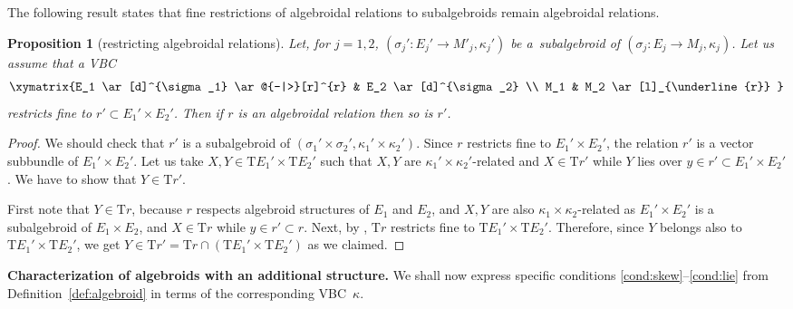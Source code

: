 \documentclass[10pt,a4paper]{amsart}
\newcommand{\ZM}{{VBC}} %
\newcommand{\und}{\underline}
\newcommand{\ra}{\rightarrow}
\newcommand{\T}{\mathrm{T}} %
\numberwithin{equation}{section}
\newtheorem{prop}[thm]{Proposition}
\theoremstyle{definition}
\begin{document}
The following result states that fine restrictions of algebroidal relations to subalgebroids remain algebroidal relations.
\begin{prop}[restricting algebroidal relations]\label{prop:sub_r_also_algebroidal}
Let, for $j=1,2$, $(\sigma_j'\colon E_j'\ra M'_j, \kappa_j')$ be a~subalgebroid of $(\sigma_j\colon E_j\ra M_j, \kappa_j)$. Let us assume that a \ZM
\begin{gather*}
 \xymatrix{E_1 \ar[d]^{\sigma_1} \ar@{-|>}[r]^{r} & E_2 \ar[d]^{\sigma_2} \\
M_1 & M_2 \ar[l]_{\und{r}} }
\end{gather*}
restricts fine to $r'\subset E_1'\times E_2'$. Then if $r$ is an algebroidal relation then so is $r'$.
\end{prop}
\begin{proof} We should check that $r'$ is a subalgebroid of $(\sigma_1'\times \sigma_2',\kappa_1'\times\kappa_2')$. Since $r$ restricts fine to $E_1'\times E_2'$, the relation $r'$ is a vector subbundle of $E_1'\times E_2'$. Let us take $X, Y\in \T E_1'\times \T E_2'$ such that $X,Y$ are $\kappa_1'\times \kappa_2'$-related and $X\in \T r'$ while $Y$ lies over $y\in r'\subset E_1'\times E_2'$. We have to show that $Y\in\T r'$.

First note that $Y\in \T r$, because $r$ respects algebroid structures of $E_1$ and $E_2$, and $X, Y$ are also $\kappa_1\times \kappa_2$-related as $E_1'\times E_2'$ is a subalgebroid of $E_1\times E_2$, and $X\in \T r$ while $y\in r'\subset r$. Next, by \cite[Theorem~A.5]{MJ_MR_models_high_alg_2015}, $\T r$ restricts fine to $\T E_1'\times \T E_2'$. Therefore, since $Y$ belongs also to $\T E_1'\times \T E_2'$, we get $Y\in \T r' = \T r\cap (\T E_1'\times \T E_2')$ as we claimed.
\end{proof}

{\bf Characterization of algebroids with an additional structure.} We shall now express specific conditions \eqref{cond:skew}--\eqref{cond:lie} from Definition~\ref{def:algebroid} in terms of the corresponding \ZM\ $\kappa$.
\end{document}
